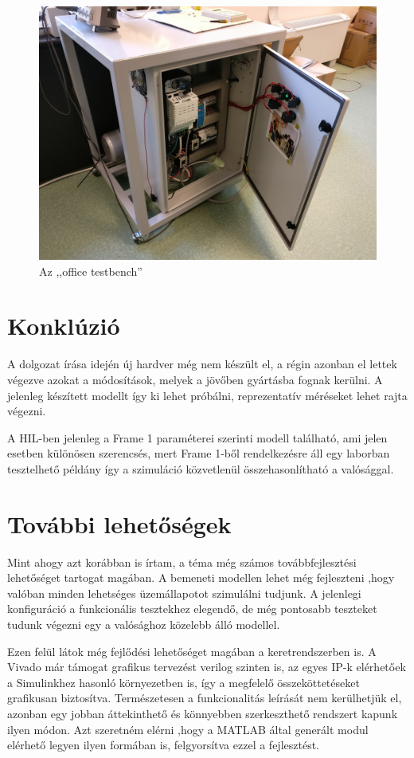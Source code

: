 \begin{figure}[H]
	\centering
	\includegraphics[width = \textwidth]{figures/office_testbench.jpg}
	\caption{Az ,,office testbench''} 
	\label{fig:office_testbench}
\end{figure}



\section{Konklúzió}

A dolgozat írása idején új hardver még nem készült el, a régin azonban el lettek végezve azokat a módosítások, melyek a jövőben gyártásba fognak kerülni. A jelenleg készített modellt így ki lehet próbálni, reprezentatív méréseket lehet rajta végezni.

A HIL-ben jelenleg a Frame 1 paraméterei szerinti modell található, ami jelen esetben különösen szerencsés, mert Frame 1-ből rendelkezésre áll egy laborban tesztelhető példány így a szimuláció közvetlenül összehasonlítható a valósággal.


\section{További lehetőségek}

Mint ahogy azt korábban is írtam, a téma még számos továbbfejlesztési lehetőséget tartogat magában. A bemeneti modellen lehet még fejleszteni ,hogy valóban minden lehetséges üzemállapotot szimulálni tudjunk. A jelenlegi konfiguráció a funkcionális tesztekhez elegendő, de még pontosabb teszteket tudunk végezni egy a valósághoz közelebb álló modellel.

Ezen felül látok még fejlődési lehetőséget magában a keretrendszerben is. A Vivado már támogat grafikus tervezést verilog szinten is, az egyes IP-k elérhetőek a Simulinkhez hasonló környezetben is, így a megfelelő összeköttetéseket grafikusan biztosítva. Természetesen a funkcionalitás leírását nem kerülhetjük el, azonban egy jobban áttekinthető és könnyebben szerkeszthető rendszert kapunk ilyen módon. Azt szeretném elérni ,hogy a MATLAB által generált modul elérhető legyen ilyen formában is, felgyorsítva ezzel a fejlesztést.